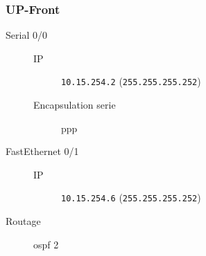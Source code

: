 \subsubsection{UP-Front}

	\begin{description}
		\item[Serial 0/0] 
		\begin{description}
			\item[IP] \texttt{10.15.254.2} (\texttt{255.255.255.252})
			\item[Encapsulation serie] ppp
		\end{description}

		\item[FastEthernet 0/1] 
		\begin{description}
			\item[IP] \texttt{10.15.254.6} (\texttt{255.255.255.252})
		\end{description}

		\item[Routage] ospf 2
	\end{description}
